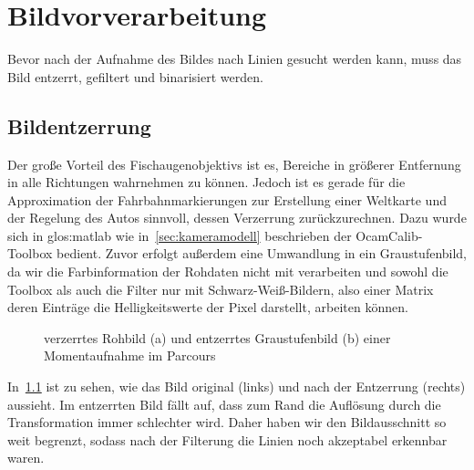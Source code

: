 \chapter{Bildvorverarbeitung}

Bevor nach der Aufnahme des Bildes nach Linien gesucht werden kann, muss das Bild entzerrt, gefiltert und binarisiert werden. 

\section{Bildentzerrung}

Der große Vorteil des Fischaugenobjektivs ist es, Bereiche in größerer Entfernung in alle Richtungen  wahrnehmen zu können. Jedoch ist es gerade für die Approximation der Fahrbahnmarkierungen zur Erstellung einer Weltkarte und der Regelung des Autos sinnvoll, dessen Verzerrung zurückzurechnen. Dazu wurde sich in \gls{glos:matlab} wie in~\ref{sec:kameramodell} beschrieben der OcamCalib-Toolbox bedient. Zuvor erfolgt außerdem eine Umwandlung in ein Graustufenbild, da wir die Farbinformation der Rohdaten nicht mit verarbeiten und sowohl die Toolbox als auch die Filter nur mit Schwarz-Weiß-Bildern, also einer Matrix deren Einträge die Helligkeitswerte der Pixel darstellt, arbeiten können. 

\begin{figure}[ht] %
  \centering
  \qquad
  \caption{verzerrtes Rohbild (a) und entzerrtes Graustufenbild (b) einer Momentaufnahme im Parcours}
\label{fig:bildvorverarbeitung_entzerren}
\end{figure} 

In~\ref{fig:bildvorverarbeitung_entzerren} ist zu sehen, wie das Bild original (links) und nach der Entzerrung (rechts) aussieht. Im entzerrten Bild fällt auf, dass zum Rand die Auflösung durch die Transformation immer schlechter wird. Daher haben wir den Bildausschnitt so weit begrenzt, sodass nach der Filterung die Linien noch akzeptabel erkennbar waren.

